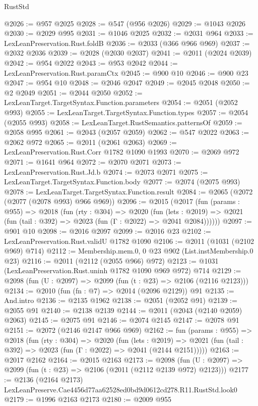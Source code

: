 \begin{lexlean}{RustStd}
\begin{coremodule}
@2026 := @957 @2025
@2028 := @547 (@956 @2026)
@2029 := @1043 @2026
@2030 := @2029 @995
@2031 := @1046 @2025
@2032 := @2031 @964
@2033 := LexLeanPreservation.Rust.foldB
@2036 := @2033 (@366 @966 @969)
@2037 := @2032 @2036
@2039 := @2028 (@2030 @2037)
@2041 := @2011 (@2024 @2039)
@2042 := @954 @2022
@2043 := @953 @2042
@2044 := LexLeanPreservation.Rust.paramCtx
@2045 := @900 @10
@2046 := @900 @23
@2047 := @954 @10
@2048 := @2046 @2047
@2049 := @2045 @2048
@2050 := @2 @2049
@2051 := @2044 @2050
@2052 := LexLeanTarget.TargetSyntax.Function.parameters
@2054 := @2051 (@2052 @993)
@2055 := LexLeanTarget.TargetSyntax.Function.types
@2057 := @2054 (@2055 @993)
@2058 := LexLeanTarget.RustSemantics.patternsOf
@2059 := @2058 @995
@2061 := @2043 (@2057 @2059)
@2062 := @547 @2022
@2063 := @2062 @972
@2065 := @2011 (@2061 @2063)
@2069 := LexLeanPreservation.Rust.Corr @1782 @1090 @1993
@2070 := @2069 @972
@2071 := @1641 @964
@2072 := @2070 @2071
@2073 := LexLeanPreservation.Rust.Jd.b
@2074 := @2073 @2071
@2075 := LexLeanTarget.TargetSyntax.Function.body
@2077 := @2074 (@2075 @993)
@2078 := LexLeanTarget.TargetSyntax.Function.result
@2084 := @2065 (@2072 (@2077 (@2078 @993) @966 @969))
@2096 := @2015
    (@2017
      (fun (params : @955) =>
      @2018
        (fun (rty : @304) =>
        @2020
          (fun (lets : @2019) =>
          @2021 (fun (tail : @392) => @2023 (fun (Γ : @2022) => @2041 @2084))))))
@2097 := @901 @10
@2098 := @2016 @2097
@2099 := @2016 @23
@2102 := LexLeanPreservation.Rust.validU @1782 @1090
@2106 := @2011 (@1031 (@2102 @969) @714)
@2112 := Membership.mem.{0, 0} @23 @902 (List.instMembership.{0} @23)
@2116 := @2011 (@2112 (@2055 @966) @972)
@2123 := @1031 (LexLeanPreservation.Rust.uninh @1782 @1090 @969 @972) @714
@2129 := @2098 (fun (U : @2097) => @2099 (fun (t : @23) => @2106 (@2116 @2123)))
@2134 := @2010 (fun (fn : @7) => @2014 (@2096 @2129)) @91
@2135 := And.intro
@2136 := @2135 @1962
@2138 := @2051 (@2052 @91)
@2139 := @2055 @91
@2140 := @2138 @2139
@2144 := @2011 (@2043 (@2140 @2059) @2063)
@2145 := @2075 @91
@2146 := @2074 @2145
@2147 := @2078 @91
@2151 := @2072 (@2146 @2147 @966 @969)
@2162 := fun (params : @955) =>
  @2018
    (fun (rty : @304) =>
    @2020
      (fun (lets : @2019) =>
      @2021 (fun (tail : @392) => @2023 (fun (Γ : @2022) => @2041 (@2144 @2151)))))
@2163 := @2017 @2162
@2164 := @2015 @2163
@2173 := @2098 (fun (U : @2097) => @2099 (fun (t : @23) => @2106 (@2011 (@2112 @2139 @972) @2123)))
@2177 := @2136 (@2164 @2173) LexLeanPreserve.Cae4456d77aa62528ed0bd9d0612cd278.R11.RustStd.look0
@2179 := @1996 @2163 @2173
@2180 := @2009 @955

\end{coremodule}
\end{lexlean}
